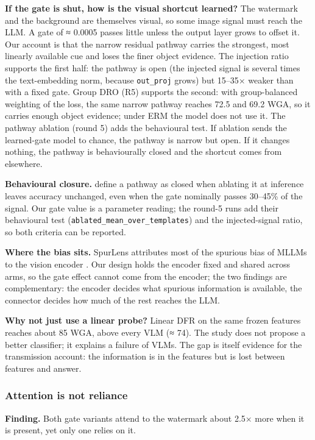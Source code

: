 \textbf{If the gate is shut, how is the visual shortcut learned?} The watermark and the background are themselves
visual, so some image signal must reach the LLM. A gate of ≈ 0.0005 passes little unless the output layer grows
to offset it. Our account is that the narrow residual pathway carries the strongest, most linearly available cue
and loses the finer object evidence. The injection ratio supports the first half: the pathway is open (the
injected signal is several times the text-embedding norm, because \texttt{out\_proj} grows) but 15--35× weaker than
with a fixed gate. Group DRO (R5) supports the second: with group-balanced weighting of the loss, the same
narrow pathway reaches 72.5 and 69.2 WGA, so it carries enough object evidence; under ERM the model does not
use it. The pathway ablation (round 5) adds the behavioural test. If ablation sends the learned-gate model to chance, the pathway is narrow but open. If it changes
nothing, the pathway is behaviourally closed and the shortcut comes from elsewhere.

\textbf{Behavioural closure.} \cite{farazi2026gate} define a pathway as closed when ablating it at inference leaves
accuracy unchanged, even when the gate nominally passes 30--45\% of the signal. Our gate value is a parameter
reading; the round-5 runs add their behavioural test (\texttt{ablated\_mean\_over\_templates}) and the injected-signal
ratio, so both criteria can be reported.

\textbf{Where the bias sits.} SpurLens attributes most of the spurious bias of MLLMs to the vision encoder
\cite{hosseini2025spurlens}. Our design holds the encoder fixed and shared across arms, so the gate effect cannot
come from the encoder; the two findings are complementary: the encoder decides what spurious information is
available, the connector decides how much of the rest reaches the LLM.

\textbf{Why not just use a linear probe?} Linear DFR on the same frozen features reaches about 85 WGA, above every
VLM (≈ 74). The study does not propose a better classifier; it explains a failure of VLMs. The gap is itself
evidence for the transmission account: the information is in the features but is lost between features and
answer.

\subsubsection{Attention is not reliance}

\textbf{Finding.} Both gate variants attend to the watermark about 2.5× more when it is present, yet only one relies
on it.

